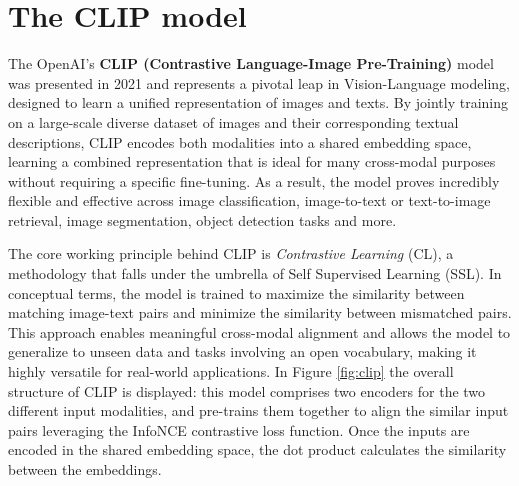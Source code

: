 \documentclass[a4paper, oneside, english]{sapthesis} %
\begin{document}



\chapter{The CLIP model} %

The OpenAI's \textbf{CLIP (Contrastive Language-Image Pre-Training)} model \cite{radford2021learning} was presented in 2021 and represents a pivotal leap in Vision-Language modeling, designed to learn a unified representation of images and texts. By jointly training on a large-scale diverse dataset of images and their corresponding textual descriptions, CLIP encodes both modalities into a shared embedding space, learning a combined representation that is ideal for many cross-modal purposes without requiring a specific fine-tuning. As a result, the model proves incredibly flexible and effective across image classification, image-to-text or text-to-image retrieval, image segmentation, object detection tasks and more.

The core working principle behind CLIP is \emph{Contrastive Learning} (CL), a methodology that falls under the umbrella of Self Supervised Learning (SSL). In conceptual terms, the model is trained to maximize the similarity between matching image-text pairs and minimize the similarity between mismatched pairs. This approach enables meaningful cross-modal alignment and allows the model to generalize to unseen data and tasks involving an open vocabulary, making it highly versatile for real-world applications. In Figure \ref{fig:clip} the overall structure of CLIP is displayed: this model comprises two encoders for the two different input modalities, and pre-trains them together to align the similar input pairs leveraging the InfoNCE contrastive loss function. Once the inputs are encoded in the shared embedding space, the dot product calculates the similarity between the embeddings.
\end{document}
